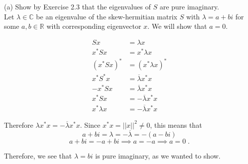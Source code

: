 \documentclass[11pt]{article}
\begin{document}
(a) Show by Exercise 2.3 that the eigenvalues of $S$ are pure imaginary. \\

Let $\lambda \in \mathbb{C}$ be an eigenvalue of the skew-hermitian matrix $S$ with $\lambda = a+bi$ for some $a,b \in \mathbb{R}$ with corresponding eigenvector $x$. We will show that $a = 0$. 

\begin{align*}
Sx &= \lambda x\\
x^*Sx &= x^* \lambda x\\
(x^*Sx)^* &= (x^*\lambda x)^*\\
x^*S^*x &= \overline{\lambda}x^*x\\
-x^*Sx &= \overline{\lambda}x^*x\\
x^*Sx &= -\overline{\lambda}x^*x\\
x^*\lambda x &= -\overline{\lambda}x^*x
\end{align*}

Therefore $\lambda x^* x = -\overline{\lambda}x^* x$. Since $x^*x = ||x||^2 \neq 0$, this means that $$a+bi = \lambda = -\overline{\lambda} = -(a-bi)$$
$$a+bi = -a+bi \implies a = -a \implies a = 0\;.$$

Therefore, we see that $\lambda = bi$ is pure imaginary, as we wanted to show.
\end{document}
